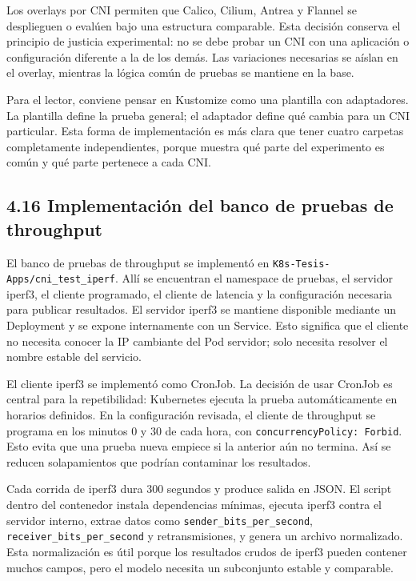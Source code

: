 \documentclass[journal]{IEEEtran}
\begin{document}
Los overlays por CNI permiten que Calico, Cilium, Antrea y Flannel se desplieguen o evalúen bajo una estructura comparable. Esta decisión conserva el principio de justicia experimental: no se debe probar un CNI con una aplicación o configuración diferente a la de los demás. Las variaciones necesarias se aíslan en el overlay, mientras la lógica común de pruebas se mantiene en la base.

Para el lector, conviene pensar en Kustomize como una plantilla con adaptadores. La plantilla define la prueba general; el adaptador define qué cambia para un CNI particular. Esta forma de implementación es más clara que tener cuatro carpetas completamente independientes, porque muestra qué parte del experimento es común y qué parte pertenece a cada CNI.

\subsection{4.16 Implementación del banco de pruebas de throughput}

El banco de pruebas de throughput se implementó en \texttt{K8s-Tesis-Apps/cni\_test\_iperf}. Allí se encuentran el namespace de pruebas, el servidor iperf3, el cliente programado, el cliente de latencia y la configuración necesaria para publicar resultados. El servidor iperf3 se mantiene disponible mediante un Deployment y se expone internamente con un Service. Esto significa que el cliente no necesita conocer la IP cambiante del Pod servidor; solo necesita resolver el nombre estable del servicio.

El cliente iperf3 se implementó como CronJob. La decisión de usar CronJob es central para la repetibilidad: Kubernetes ejecuta la prueba automáticamente en horarios definidos. En la configuración revisada, el cliente de throughput se programa en los minutos 0 y 30 de cada hora, con \texttt{concurrencyPolicy: Forbid}. Esto evita que una prueba nueva empiece si la anterior aún no termina. Así se reducen solapamientos que podrían contaminar los resultados.

Cada corrida de iperf3 dura 300 segundos y produce salida en JSON. El script dentro del contenedor instala dependencias mínimas, ejecuta iperf3 contra el servidor interno, extrae datos como \texttt{sender\_bits\_per\_second}, \texttt{receiver\_bits\_per\_second} y retransmisiones, y genera un archivo normalizado. Esta normalización es útil porque los resultados crudos de iperf3 pueden contener muchos campos, pero el modelo necesita un subconjunto estable y comparable.
\end{document}
